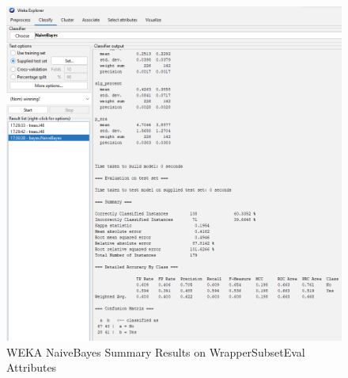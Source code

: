 \documentclass[12pt]{article}
\begin{document}
\begin{figure}[h!]
    \includegraphics[scale=0.4]{./images/WrapperSubsetEval/NaiveBayes-Summary.png}
\centering
    \caption{WEKA NaiveBayes Summary Results on WrapperSubsetEval Attributes}
\end{figure}

\newpage
\end{document}
